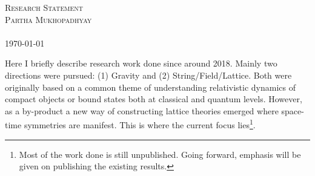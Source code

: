 \documentclass[
article,12pt]{article}
\begin{document}

\begin{center}
{\Huge \scshape Research Statement} \\ 
\vspace{0.12in}
{\Large \scshape Partha Mukhopadhyay} \\ 
\vspace{0.07in}
\small{ 
\href{https://www.imsc.res.in/partha_mukhopadhyay}{{\faHome} \hspace{0.3em}} 
\href{mailto:mukhopadhyay.res@gmail.com}{{\faEnvelope} \hspace{0.3em}} 
\href{https://t.me/ParthoM7}{{\faTelegram} \hspace{0.3em}}
\href{https://www.linkedin.com/in/parthom7}{{\faLinkedin} \hspace{0.3em}}
\href{https://www.youtube.com/@ParthoM7}{{\faYoutube} \hspace{0.3em}}
\href{https://inspirehep.net/authors/996534}{{} \hspace{0.13em}}
\href{https://github.com/ParthoM7}{{\faGithub}}} \\
\vspace{0.07in}
\today \\
\vspace{0.07in}


\end{center}

\medskip 

Here I briefly describe research work done since around 2018.  Mainly two directions were pursued: (1) Gravity and (2) String/Field/Lattice. Both were originally based on a common theme of understanding relativistic dynamics of compact objects or bound states both at classical and quantum levels. However, as a by-product a new way of constructing lattice theories emerged where space-time symmetries are manifest. This is where the current focus lies\footnote{Most of the work done is still unpublished. Going forward, emphasis will be given on publishing the existing results.}. 
\end{document}
